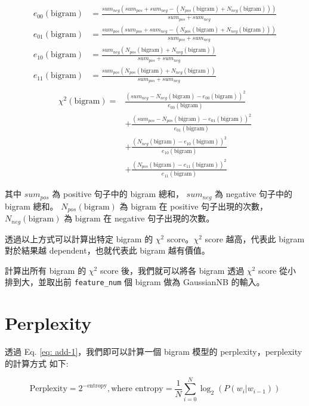 \documentclass{article}[12pt]
\begin{document}
\begin{align*}
    e_{00}(\text{bigram}) &= \frac{sum_{neg}(sum_{pos}+sum_{neg}-(N_{pos}(\text{bigram})+N_{neg}(\text{bigram})))}{sum_{pos}+sum_{neg}} \\
    e_{01}(\text{bigram}) &= \frac{sum_{pos}(sum_{pos}+sum_{neg}-(N_{pos}(\text{bigram})+N_{neg}(\text{bigram})))}{sum_{pos}+sum_{neg}} \\
    e_{10}(\text{bigram}) &= \frac{sum_{neg}(N_{pos}(\text{bigram})+N_{neg}(\text{bigram}))}{sum_{pos}+sum_{neg}} \\
    e_{11}(\text{bigram}) &= \frac{sum_{pos}(N_{pos}(\text{bigram})+N_{neg}(\text{bigram}))}{sum_{pos}+sum_{neg}} \\
\end{align*}
\begin{equation}
    \begin{aligned}
        \chi^2(\text{bigram}) = &\frac{(sum_{neg} - N_{neg}(\text{bigram}) - e_{00}(\text{bigram}))^2}{e_{00}(\text{bigram})} \\
        &+ \frac{(sum_{pos} - N_{pos}(\text{bigram}) - e_{01}(\text{bigram}))^2}{e_{01}(\text{bigram})} \\
        &+ \frac{(N_{neg}(\text{bigram}) - e_{10}(\text{bigram}))^2}{e_{10}(\text{bigram})} \\
        &+ \frac{(N_{pos}(\text{bigram}) - e_{11}(\text{bigram}))^2}{e_{11}(\text{bigram})}
    \end{aligned}    
\end{equation}

其中 $sum_{pos}$ 為 positive 句子中的 bigram 總和，
$sum_{neg}$ 為 negative 句子中的 bigram 總和。
$N_{pos}(\text{bigram})$ 為 $\text{bigram}$ 在 positive 句子出現的次數，
$N_{neg}(\text{bigram})$ 為 $\text{bigram}$ 在 negative 句子出現的次數。

透過以上方式可以計算出特定 bigram 的 $\chi^2$ score。$\chi^2$ score 越高，代表此 bigram
對於結果越 dependent，也就代表此 bigram 越有價值。

計算出所有 bigram 的 $\chi^2$ score 後，我們就可以將各 bigram 透過 $\chi^2$ score 從小
排到大，並取出前 \texttt{feature\_num} 個 bigram 做為 GaussianNB 的輸入。

\section{Perplexity}
透過 Eq. \ref{eq: add-1}，我們即可以計算一個 bigram 模型的 perplexity，perplexity 的計算方式
如下:

\begin{equation}
    \text{Perplexity} = 2^{-\text{entropy}}, \text{where entropy} = \frac{1}{N} \sum^{N}_{i=0} \log_{2}(P(w_i|w_{i-1}))
\end{equation}
\end{document}
